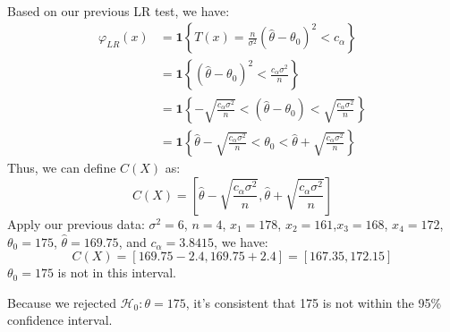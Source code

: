 \begin{solution}
    \

    Based on our previous LR test, we have:
    \begin{align*}
        \varphi_{LR}(x) &= \mathbf{1}\left\{ T(x) = \frac{n}{\sigma^2}(\hat{\theta} - \theta_0)^2 < c_\alpha\right\} \\
        &= \mathbf{1}\left\{(\hat{\theta} - \theta_0)^2 < \frac{c_\alpha\sigma^2}{n}\right\} \\
        &= \mathbf{1}\left\{-\sqrt{\frac{c_\alpha\sigma^2}{n}} < (\hat{\theta} - \theta_0) < \sqrt{\frac{c_\alpha\sigma^2}{n}}\right\} \\
        &= \mathbf{1}\left\{\hat{\theta} -\sqrt{\frac{c_\alpha\sigma^2}{n}} < \theta_0 < \hat{\theta} + \sqrt{\frac{c_\alpha\sigma^2}{n}}\right\}
    \end{align*}
    Thus, we can define $C(X)$ as:
    \[
    C(X) = \left[\hat{\theta} -\sqrt{\frac{c_\alpha\sigma^2}{n}}, \hat{\theta} +\sqrt{\frac{c_\alpha\sigma^2}{n}}  \right]
    \]
    Apply our previous data: $\sigma^2=6$, $n=4$, $x_1=178$, $x_2=161$,$x_3=168$, $x_4=172$, $\theta_0=175$, $\hat{\theta}=169.75$, and $c_\alpha=3.8415$, we have:
    \[
    C(X) = [169.75-2.4, 169.75+2.4] = [167.35, 172.15]
    \]
    $\theta_0=175$ is not in this interval.

    Because we rejected $\mathcal{H}_0: \theta=175$, it's consistent that 175 is not within the 95\% confidence interval.
\end{solution}
